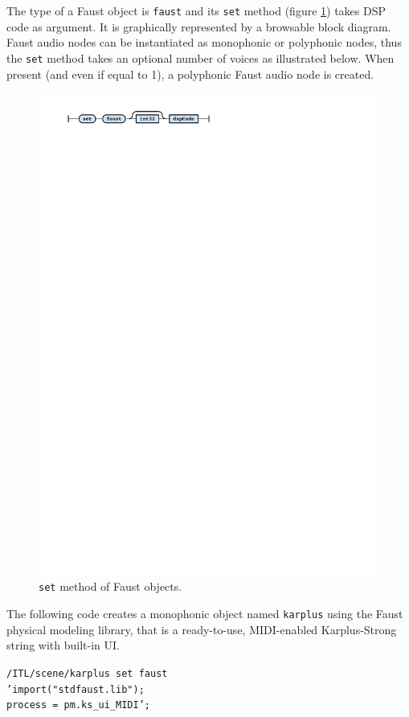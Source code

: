 \documentclass{article}
\newcommand{\icode}[1]	{{\small \texttt{#1}}}
\newcommand{\code}[1]	{\vspace{-1em}\begin{center}\colorbox{mygrey}{\begin{minipage}[t]{0.98\columnwidth} {\scriptsize \texttt{#1}}\end{minipage}}\end{center}}
\begin{document}
The type of a Faust object is \icode{faust} and its \icode{set} method (figure \ref{fig:fset}) takes DSP code as argument. It is graphically represented by a browsable block diagram. Faust audio nodes can be instantiated as monophonic or polyphonic nodes, thus the \icode{set} method takes an optional number of voices as illustrated below. When present (and even if equal to 1), a polyphonic Faust audio node is created. 
\begin{figure}[h]
\centering
\includegraphics[width=0.9\columnwidth]{rsrc/faust1.pdf}
\caption{\icode{set} method of Faust objects.}
\label{fig:fset}
\end{figure}

The following code creates a monophonic object named \icode{karplus} using the Faust physical modeling library, that is a ready-to-use, MIDI-enabled Karplus-Strong string with built-in UI.
\code{/ITL/scene/karplus set faust \\
\hspace*{10mm} 'import("stdfaust.lib"); \\
\hspace*{11mm} process = pm.ks\_ui\_MIDI';}
\end{document}
